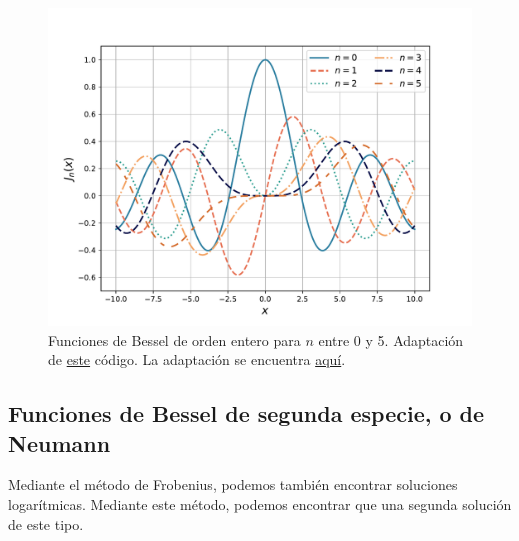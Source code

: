 \begin{figure}[htbp]
    \centering
    \includegraphics[width = 12cm]{Figuras/Bessel_first_Kind.pdf}
    \caption{Funciones de Bessel de orden entero para $n$ entre 0 y 5. Adaptación de \href{https://github.com/gfrubi/FM2/blob/master/figuras-editables/fig-Bessel.py}{este} código. La adaptación se encuentra \href{https://github.com/Pedroga-cc/Fisica-Matematica-II/blob/main/Figuras/Plotter_Bessel.py}{aquí}.}
    \label{fig:Bessel_entero}
\end{figure}

\subsection{Funciones de Bessel de segunda especie, o de Neumann}

Mediante el método de Frobenius, podemos también encontrar soluciones logarítmicas. Mediante este método, podemos encontrar que una segunda solución de este tipo.

